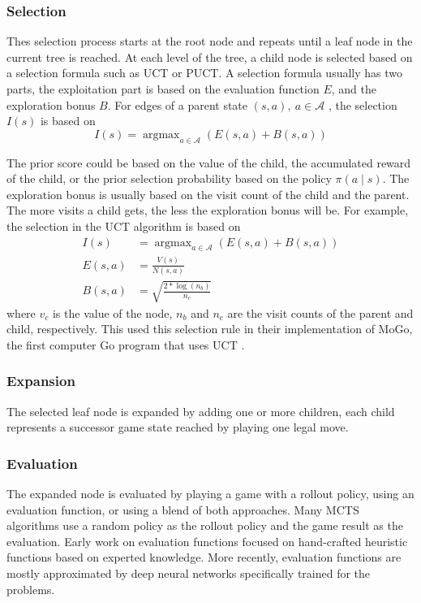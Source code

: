 
\subsubsection{Selection}
Thes selection process starts at the root node and repeats until a leaf node in the current tree is reached.
At each level of the tree, a child node is selected based on a selection formula such as UCT or PUCT.
A selection formula usually has two parts, the exploitation part is based on the evaluation function $E$, and the exploration bonus $B$.
For edges of a parent state $(s, a), ~ a \in \mathcal{A}$ , the selection $I(s)$ is based on
\begin{equation}
    \label{eq:mcts_selection}
    I(s) = \operatorname{argmax}_{a \in \mathcal{A}} \left( E(s, a) + B(s, a) \right)
\end{equation}

The prior score could be based on the value of the child, the accumulated reward of the child, or the prior selection probability based on the policy $\pi(a \mid s)$.
The exploration bonus is usually based on the visit count of the child and the parent.
The more visits a child gets, the less the exploration bonus will be.
For example, the selection in the UCT algorithm is based on
\begin{align*}
    I(s)     & = \operatorname{argmax}_{a \in \mathcal{A}} \left( E(s, a) + B(s, a) \right)  \\
    E(s, a)  & = \frac{V(s)}{N(s, a)}  \\
    B(s, a)  & = \sqrt{\frac{2 * \log(n_b)}{n_c}}
\end{align*}
where $v_c$ is the value of the node, $n_b$ and $n_c$ are the visit counts of the parent and child, respectively.
This \citeauthor{ModificationUCTPatterns_Gelly.Wang.ea_2006} used this selection rule in their implementation of MoGo,
the first computer Go program that uses UCT \cite{ModificationUCTPatterns_Gelly.Wang.ea_2006}.

\subsubsection{Expansion}
The selected leaf node is expanded by adding one or more children, each child represents a successor game state reached by playing one legal move.

\subsubsection{Evaluation}
The expanded node is evaluated by playing a game with a rollout policy, using an evaluation function, or using a blend of both approaches.
Many MCTS algorithms use a random policy as the rollout policy and the game result as the evaluation.
Early work on evaluation functions focused on hand-crafted heuristic functions based on experted knowledge.
More recently, evaluation functions are mostly approximated by deep neural networks specifically trained for the problems.

